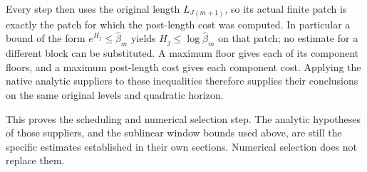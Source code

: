 Every step then uses the original length $L_{J(m+1)}$, so its
actual finite patch is exactly the patch for which the post-length
cost was computed. In particular a bound of the form
$e^{H_j}\le\widehat\beta_m$ yields
$H_j\le\log\widehat\beta_m$ on that patch; no estimate for a
different block can be substituted. A maximum floor gives each
of its component floors, and a maximum post-length cost gives
each component cost. Applying the native analytic suppliers to
these inequalities therefore supplies their conclusions on the
same original levels and quadratic horizon.

This proves the scheduling and numerical selection step. The
analytic hypotheses of those suppliers, and the sublinear window
bounds used above, are still the specific estimates established
in their own sections. Numerical selection does not replace them.
